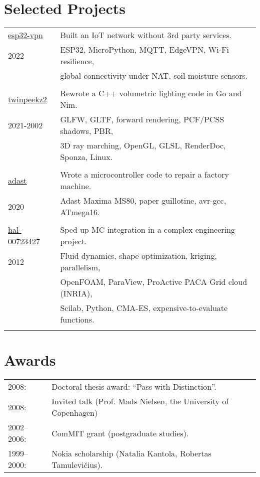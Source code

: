 \documentclass[a4paper,11pt]{article}
\begin{document}
\section*{Selected Projects}
\label{sect:pubs}

\begin{tabular}{ll}
\href{https://github.com/aabbtree77/esp32-vpn}{esp32-vpn} & Built an IoT network without 3rd party services.\\
               2022    & ESP32, MicroPython, MQTT, EdgeVPN, Wi-Fi resilience,\\
                       & global connectivity under NAT, soil moisture sensors.\\
                       &\\
\href{https://github.com/aabbtree77/twinpeekz2}{twinpeekz2}    & Rewrote a C++ volumetric lighting code in Go and Nim.\\
                   2021-2002       & GLFW, GLTF, forward rendering, PCF/PCSS shadows, PBR, \\
                          & 3D ray marching, OpenGL, GLSL, RenderDoc, Sponza, Linux.\\
                          &\\
\href{https://github.com/aabbtree77/adast}{adast} & Wrote a microcontroller code to repair a factory machine. \\
2020 & Adast Maxima MS80, paper guillotine, avr-gcc, ATmega16. \\
     &\\                        
\href{https://hal.archives-ouvertes.fr/hal-00723427}{hal-00723427} & Sped up MC integration in a complex engineering project.\\
                     2012 & Fluid dynamics, shape optimization, kriging, parallelism, \\             
                     & OpenFOAM, ParaView, ProActive PACA Grid cloud (INRIA),\\
                                  & Scilab, Python, CMA-ES, expensive-to-evaluate functions.\\
                          &  \\        
\end{tabular}

%


%
%
\section*{Awards}
%
\begin{tabular}{ll}
        2008: & Doctoral thesis award: “Pass with Distinction”.\\
        2008: & Invited talk (Prof. Mads Nielsen, the University of Copenhagen)\\
        2002--2006:& ComMIT grant (postgraduate studies).\\
        1999--2000:& Nokia scholarship (Natalia Kantola, Robertas Tamulevi\v{c}ius).
\end{tabular}
%
%

\end{document}
